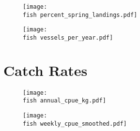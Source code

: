 \documentclass{beamer}
\newcommand{\fish}{C:/Rsaves/fishery/2017/}
\begin{document}

\begin{frame}
\begin{figure}

 \vspace*{-0.25cm}
 \centerline{\texttt{[image: \\fish percent\_spring\_landings.pdf]}}

 \end{figure}
\end{frame}



\begin{frame}
\begin{figure}

 \centerline{\texttt{[image: \\fish vessels\_per\_year.pdf]}}

 \end{figure}
\end{frame}



\section{Catch Rates}


\begin{frame}
\begin{figure}

 \vspace*{-.25cm}
 \centerline{\texttt{[image: \\fish annual\_cpue\_kg.pdf]}}

 \end{figure}
\end{frame}



\begin{frame}
\begin{figure}

 \vspace*{-.5cm}
 \centerline{\texttt{[image: \\fish weekly\_cpue\_smoothed.pdf]}}

 \end{figure}
\end{frame}
\end{document}
